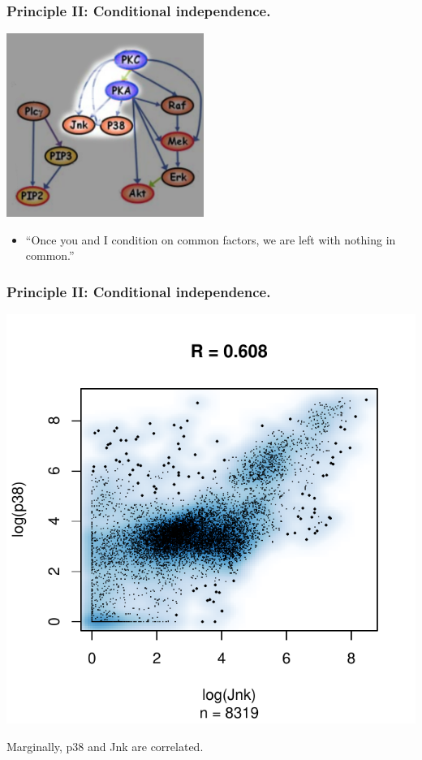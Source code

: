 \documentclass{beamer}
\begin{document}
\begin{frame}
\frametitle{Principle II: Conditional independence.}

\begin{center}
\includegraphics[scale = 0.5]{../images/fig03_03.png}
\end{center}

\begin{itemize}
\item ``Once you and I condition on common factors, we are left with nothing in common.''
\end{itemize}

\end{frame}

\begin{frame}
\frametitle{Principle II: Conditional independence.}

\begin{center}
\includegraphics[scale = 0.5]{../images/plot03_01.pdf}
\end{center}

Marginally, p38 and Jnk are correlated.

\end{frame}
\end{document}
